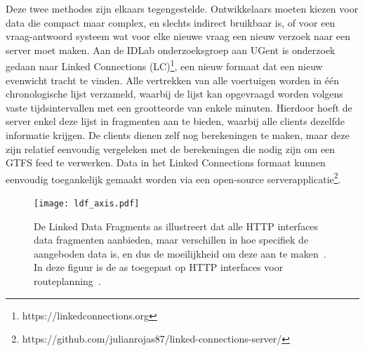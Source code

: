 Deze twee methodes zijn elkaars tegengestelde. Ontwikkelaars moeten kiezen voor data die compact maar complex, en slechts indirect bruikbaar is, of voor een vraag-antwoord systeem wat voor elke nieuwe vraag een nieuw verzoek naar een server moet maken. Aan de IDLab onderzoeksgroep aan UGent is onderzoek gedaan naar Linked Connections (LC)\footnote{https://linkedconnections.org}, een nieuw formaat dat een nieuw evenwicht tracht te vinden. Alle vertrekken van alle voertuigen worden in één chronologische lijst verzameld, waarbij de lijst kan opgevraagd worden volgens vaste tijdsintervallen met een grootteorde van enkele minuten. Hierdoor hoeft de server enkel deze lijst in fragmenten aan te bieden, waarbij alle clients dezelfde informatie krijgen. De clients dienen zelf nog berekeningen te maken, maar deze zijn relatief eenvoudig vergeleken met de berekeningen die nodig zijn om een GTFS feed te verwerken. Data in het Linked Connections formaat kunnen eenvoudig toegankelijk gemaakt worden via een open-source serverapplicatie\footnote{https://github.com/julianrojas87/linked-connections-server/}.

\begin{figure}
	\centering
		\texttt{[image: ldf\_axis.pdf]}
	\caption[Routeplanning HTTP interfaces op de LDF as]{De Linked Data Fragments as illustreert dat alle HTTP interfaces data fragmenten aanbieden, maar verschillen in hoe specifiek de aangeboden data is, en dus de moeilijkheid om deze aan te maken~\citep{verborgh14}. In deze figuur is de as toegepast op HTTP interfaces voor routeplanning~\citep{colpaert15}.}
	\label{fig:ldfAxis}
\end{figure}

